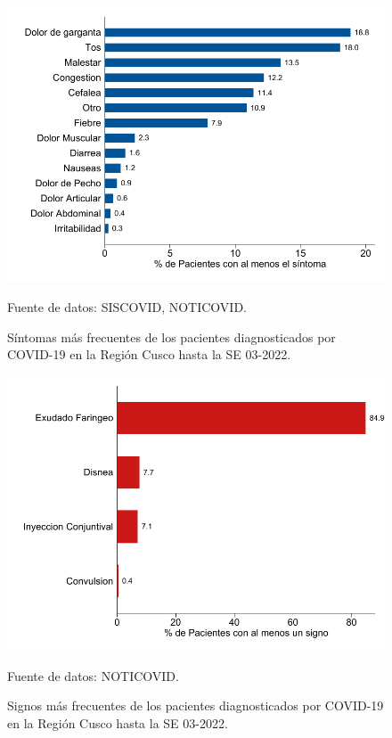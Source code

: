 \documentclass[12pt,a4paper,openany]{book}
\begin{document}
\begin{figure}[h]
	\caption{Síntomas más frecuentes de los pacientes diagnosticados por COVID-19 en la Región Cusco hasta la SE 03-2022.  }\label{fig:sintomas}
	\begin{center}
		\includegraphics[width=0.85\linewidth]{../figuras/figura_sintoma.pdf}
	\end{center}
	{\footnotesize {Fuente de datos: SISCOVID, NOTICOVID.}}
\end{figure}

\begin{figure}[h]
	\caption{Signos más frecuentes de los pacientes diagnosticados por COVID-19 en la Región Cusco hasta la SE 03-2022.}\label{fig:signos}
	\begin{center}
		\includegraphics[width=0.65\linewidth]{../figuras/figura_signo.pdf}
	\end{center}
	{\footnotesize {Fuente de datos: NOTICOVID.}}
\end{figure}
\end{document}
